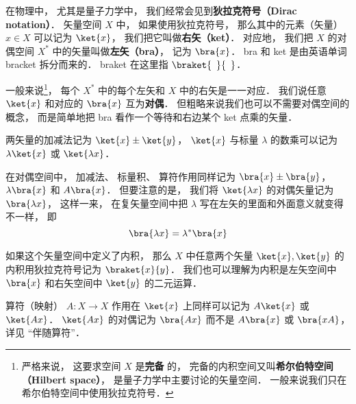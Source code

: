 

在物理中， 尤其是量子力学中， 我们经常会见到\textbf{狄拉克符号（Dirac notation）}． 矢量空间 $X$ 中， 如果使用狄拉克符号， 那么其中的元素（矢量） $x\in X$ 可以记为 $\ket{x}$， 我们把它叫做\textbf{右矢（ket）}． 对应地， 我们把 $X$ 的对偶空间 $X^*$ 中的矢量叫做\textbf{左矢（bra）}， 记为 $\bra{x}$． bra 和 ket 是由英语单词 bracket 拆分而来的． braket 在这里指 $\braket{\phantom{1}}{\phantom{1}}$．

一般来说\footnote{严格来说， 这要求空间 $X$ 是\textbf{完备}%
的， 完备的内积空间又叫\textbf{希尔伯特空间（Hilbert space）}， 是量子力学中主要讨论的矢量空间． 一般来说我们只在希尔伯特空间中使用狄拉克符号．}， 每个 $X^*$ 中的每个左矢和 $X$ 中的右矢是一一对应． 我们说任意 $\ket{x}$ 和对应的 $\bra{x}$ 互为\textbf{对偶}． 但粗略来说我们也可以不需要对偶空间的概念， 而是简单地把 bra 看作一个等待和右边某个 ket 点乘的矢量．

两矢量的加减法记为 $\ket{x} \pm \ket{y}$， $\ket{x}$ 与标量 $\lambda$ 的数乘可以记为 $\lambda\ket{x}$ 或 $\ket{\lambda x}$．

在对偶空间中， 加减法、 标量积、 算符作用同样记为 $\bra{x} \pm \bra{y}$， $\lambda\bra{x}$ 和 $A\bra{x}$． 但要注意的是， 我们将 $\ket{\lambda x}$ 的对偶矢量记为 $\bra{\lambda x}$， 这样一来， 在复矢量空间中把 $\lambda$ 写在左矢的里面和外面意义就变得不一样， 即 %
\begin{equation}
\bra{\lambda x} = \lambda^* \bra{x}
\end{equation}

如果这个矢量空间中定义了内积， 那么 $X$ 中任意两个矢量 $\ket{x}, \ket{y}$ 的内积用狄拉克符号记为 $\braket{x}{y}$． 我们也可以理解为内积是左矢空间中 $\bra{x}$ 和右矢空间中 $\ket{y}$ 的二元运算．

算符（映射） $A:X\to X$ 作用在 $\ket{x}$ 上同样可以记为 $A\ket{x}$ 或 $\ket{Ax}$． $\ket{Ax}$ 的对偶记为 $\bra{Ax}$ 而不是 $A\bra{x}$ 或 $\bra{xA}$， 详见 “伴随算符”．

